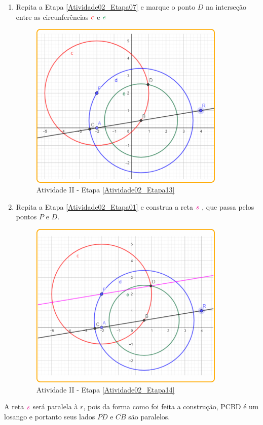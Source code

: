 \documentclass[11pt,a4paper]{article}
\begin{document}
\begin{enumerate}[{Etapa} 1.]
\item Repita a Etapa \ref{Atividade02_Etapa07} e marque o ponto $D$ na interseção entre as circunferências ${\color{red}{c}}$  e ${\color{ForestGreen}{e}}$ \label{Atividade02_Etapa13}
\begin{figure}[H]
    \centering
    \includegraphics[height=8cm]{Figuras/T01_Atividade02_Fig08.png}
    \caption{Atividade II - Etapa \ref{Atividade02_Etapa13}}
    \label{Atividade02_Etapa13_Imagem}
\end{figure}

\item Repita a Etapa \ref{Atividade02_Etapa01} e construa a reta ${\color{magenta}{s}}$ , que passa pelos pontos $P$ e $D$. \label{Atividade02_Etapa14}
\begin{figure}[H]
    \centering
    \includegraphics[height=8cm]{Figuras/T01_Atividade02_Fig09.png}
    \caption{Atividade II - Etapa \ref{Atividade02_Etapa14}}
    \label{Atividade02_Etapa14_Imagem}
\end{figure}
\end{enumerate}
A reta ${\color{magenta}{s}}$  será paralela à $r$, pois da forma como foi feita a construção, PCBD é um losango e portanto seus lados $\overline{PD}$ e $\overline{CB}$ são paralelos.
\end{document}
